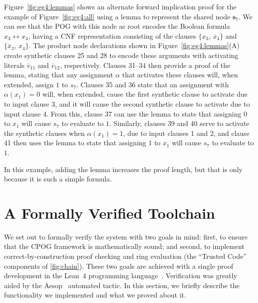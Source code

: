 \documentclass[twoside,11pt]{article}
\newcommand{\obar}[1]{\overline{#1}}
\newcommand{\assign}{\alpha}
\newcommand{\makenode}[1]{\mathbf{#1}}
\newcommand{\nodes}{\makenode{s}}
\newcommand{\lean}{Lean~4}
\begin{document}
Figure~\ref{fig:eg4:lemmas} shows an alternate forward implication
proof for the example of Figure~\ref{fig:eg4:all} using a lemma to
represent the shared node $\nodes_7$.  We can see that the POG with
this node as root encodes the Boolean formula $x_3 \leftrightarrow x_4$, having a CNF representation consisting of the clauses
$\{x_3 ,\, \obar{x}_4\}$ and $\{\obar{x}_3 ,\, {x}_4\}$.  The product node
declarations shown in Figure~\ref{fig:eg4:lemmas}(A) create synthetic
clauses 25 and 28 to encode these arguments with activating literals
$\obar{v}_{11}$ and $\obar{v}_{12}$, respectively.  Clauses 31--34
then provide a proof of the lemma, stating that any assignment
$\assign$ that activates these clauses will, when extended,  assign $1$ to $s_7$.
Clauses 35 and 36 state that an assignment with $\assign(x_1) = 0$
will, when extended, cause the first synthetic clause to activate due to input clause
3, and it will cause the second synthetic clause to activate due to
input clause 4.  From this, clause 37 can use the lemma to state that
assigning $0$ to $x_1$ will cause $s_7$ to evaluate to $1$.  Similarly,
clauses 39 and 40 serve to activate the synthetic clauses when
$\assign(x_1) = 1$, due to input clauses 1 and 2, and clause 41 then
uses the lemma to state that assigning $1$ to $x_1$ will cause $s_7$ to
evaluate to $1$.

In this example, adding the lemma increases the proof length, but that
is only because it is such a simple formula.



\section{A Formally Verified Toolchain}
\label{sect:formally-verified-toolchain}
\label{sect:lean:subtle-condition}

We set out to formally verify the system with two goals in mind: first, to ensure that the CPOG framework is mathematically
sound; and second, to implement correct-by-construction proof checking and ring evaluation (the ``Trusted Code'' components of \ref{fig:chain}). These two goals are achieved with a single proof development in the \lean{} programming language~\cite{demoura:cade:2021}. Verification was greatly aided by the Aesop~\cite{23limperg_aesop_white_box_best_first_proof_search_lean} automated tactic. In this section, we briefly describe the functionality we implemented and what we proved about it.
\end{document}
